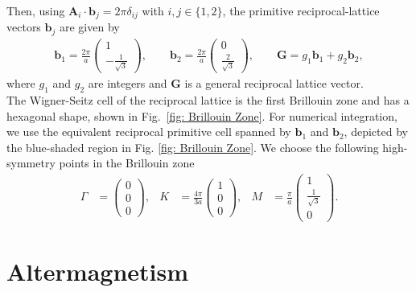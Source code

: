 Then, using $\mathbf{A}_i \cdot \mathbf{b}_j = 2\pi \delta_{ij}$ with $i,j \in \{1,2\}$, the primitive reciprocal-lattice vectors $\mathbf{b}_j$ are given by
\begin{align}
    \mathbf{b}_1 = \frac{2\pi}{a}\begin{pmatrix} 1 \\ -\frac{1}{\sqrt{3}}\end{pmatrix}, \qquad \mathbf{b}_2 = \frac{2\pi}{a}\begin{pmatrix} 0 \\ \frac{2}{\sqrt{3}}    \end{pmatrix}, \qquad \mathbf{G} = g_1 \mathbf{b}_1 + g_2 \mathbf{b}_2,
\end{align}
where $g_1$ and $g_2$ are integers and $\mathbf{G}$ is a general reciprocal lattice vector. \\
The Wigner-Seitz cell of the reciprocal lattice is the first Brillouin zone and has a hexagonal shape, shown in Fig.~\ref{fig: Brillouin Zone}.
For numerical integration, we use the equivalent reciprocal primitive cell spanned by $\mathbf{b}_1$ and $\mathbf{b}_2$, depicted by the blue-shaded region in Fig. \ref{fig: Brillouin Zone}.
We choose the following high-symmetry points in the Brillouin zone
\begin{align}
\Gamma &=
\begin{pmatrix}
0\\
0\\
0
\end{pmatrix},
&
K &=
\frac{4\pi}{3a}
\begin{pmatrix}
1\\
0\\
0
\end{pmatrix},
&
M &=
\frac{\pi}{a}
\begin{pmatrix}
1\\
\frac{1}{\sqrt{3}}\\
0
\end{pmatrix}.
\end{align}
\section{Altermagnetism}
\label{section: Altermagnetism}

